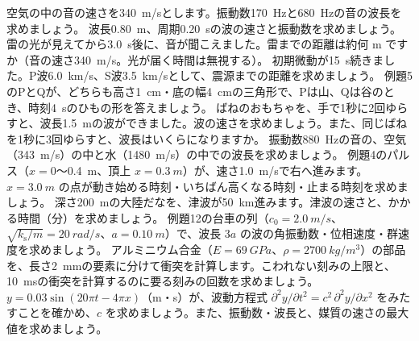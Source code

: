 \bkendproblems
{}
\bkproblem 空気の中の音の速さを\qty{340}{m/s}とします。振動数\qty{170}{Hz}と\qty{680}{Hz}の音の波長を求めましょう。
\bkproblem 波長\qty{0.80}{m}、周期\qty{0.20}{s}の波の速さと振動数を求めましょう。
\bkproblem 雷の光が見えてから\qty{3.0}{s}後に、音が聞こえました。雷までの距離は約何 m ですか（音の速さ\qty{340}{m/s}。光が届く時間は無視する）。
\bkproblem 初期微動が\qty{15}{s}続きました。P波\qty{6.0}{km/s}、S波\qty{3.5}{km/s}として、震源までの距離を求めましょう。
\bkproblem 例題5のPとQが、どちらも高さ\qty{1}{cm}・底の幅\qty{4}{cm}の三角形で、Pは山、Qは谷のとき、時刻\qty{4}{s}のひもの形を答えましょう。
\bkproblem ばねのおもちゃを、手で1秒に2回ゆらすと、波長\qty{1.5}{m}の波ができました。波の速さを求めましょう。また、同じばねを1秒に3回ゆらすと、波長はいくらになりますか。
\bkproblem 振動数\qty{880}{Hz}の音の、空気（\qty{343}{m/s}）の中と水（\qty{1480}{m/s}）の中での波長を求めましょう。
\bkproblem 例題4のパルス（$x=0$〜\qty{0.4}{m}、頂上 $x=\qty{0.3}{m}$）が、速さ\qty{1.0}{m/s}で右へ進みます。$x=\qty{3.0}{m}$ の点が動き始める時刻・いちばん高くなる時刻・止まる時刻を求めましょう。
\bkproblem 深さ\qty{200}{m}の大陸だなを、津波が\qty{50}{km}進みます。津波の速さと、かかる時間（分）を求めましょう。
\bkproblem 例題12の台車の列（$c_0=\qty{2.0}{m/s}$、$\sqrt{k_{\mathrm s}/m}=\qty{20}{rad/s}$、$a=\qty{0.10}{m}$）で、波長 $3a$ の波の角振動数・位相速度・群速度を求めましょう。
\bkproblem アルミニウム合金（$E=\qty{69}{GPa}$、$\rho=\qty{2700}{kg/m^3}$）の部品を、長さ\qty{2}{mm}の要素に分けて衝突を計算します。こわれない刻みの上限と、\qty{10}{ms}の衝突を計算するのに要る刻みの回数を求めましょう。
\bkproblem $y=0.03\sin(20\pi t-4\pi x)$（m・s）が、波動方程式 $\partial^2y/\partial t^2=c^2\,\partial^2y/\partial x^2$ をみたすことを確かめ、$c$ を求めましょう。また、振動数・波長と、媒質の速さの最大値を求めましょう。


